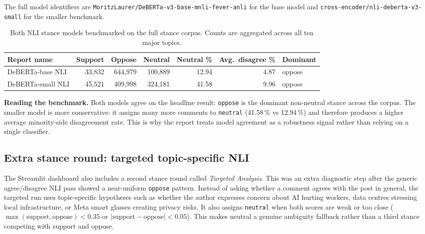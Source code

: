 \documentclass[11pt,a4paper]{article}
\begin{document}
The full model identifiers are
\texttt{MoritzLaurer/DeBERTa-v3-base-mnli-fever-anli} for the base model and
\texttt{cross-encoder/nli-deberta-v3-small} for the smaller benchmark.

\begin{table}[H]
\centering
\footnotesize
\caption{Both NLI stance models benchmarked on the full stance corpus. Counts are aggregated across
all ten major topics.}
\label{tab:stance-models}
\renewcommand{\arraystretch}{1.15}
\begin{tabular}{l r r r r r l}
\toprule
\textbf{Report name} & \textbf{Support} & \textbf{Oppose} & \textbf{Neutral} & \textbf{Neutral \%} & \textbf{Avg.\ disagree \%} & \textbf{Dominant} \\
\midrule
DeBERTa-base NLI & 33{,}832 & 644{,}979 & 100{,}889 & 12.94 & 4.87 & oppose \\
DeBERTa-small NLI & 45{,}521 & 409{,}998 & 324{,}181 & 41.58 & 9.96 & oppose \\
\bottomrule
\end{tabular}
\end{table}

\textbf{Reading the benchmark.} Both models agree on the headline result: \texttt{oppose} is the
dominant non-neutral stance across the corpus. The smaller model is more conservative: it assigns
many more comments to \texttt{neutral} (41.58\,\% vs 12.94\,\%) and therefore produces a higher
average minority-side disagreement rate. This is why the report treats model agreement as a
robustness signal rather than relying on a single classifier.

\subsection{Extra stance round: targeted topic-specific NLI}

The Streamlit dashboard also includes a second stance round called \emph{Targeted Analysis}. This
was an extra diagnostic step after the generic agree/disagree NLI pass showed a near-uniform
\texttt{oppose} pattern. Instead of asking whether a comment agrees with the post in general, the
targeted run uses topic-specific hypotheses such as whether the author expresses concern about AI
hurting workers, data centres stressing local infrastructure, or Meta smart glasses creating
privacy risks. It also assigns \texttt{neutral} when both scores are weak or too close
(\(\max(\text{support},\text{oppose}) < 0.35\) or
\(|\text{support}-\text{oppose}| < 0.05\)). This makes neutral a genuine ambiguity fallback rather
than a third stance competing with support and oppose.
\end{document}
